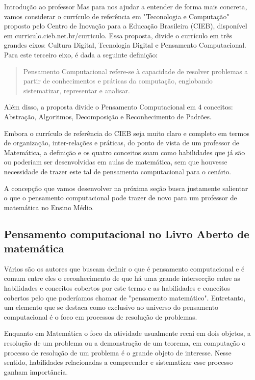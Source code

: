 \begin{apresentacao}{Introdução ao professor}
Mas para nos ajudar a entender de forma mais concreta, vamos considerar o currículo de referência em "Teconologia e Computação"{} proposto pelo Centro de Inovação para a Educação Brasileira (CIEB), disponível em curriculo.cieb.net.br/curriculo. Essa proposta, divide o currículo em três grandes eixos: Cultura Digital, Tecnologia Digital e Pensamento Computacional. Para este terceiro eixo, é dada a seguinte definição:
\begin{quote}
Pensamento Computacional refere-se à capacidade de resolver problemas a partir de conhecimentos e práticas da computação, englobando sistematizar, representar e analisar.
\end{quote}

Além disso, a proposta divide o Pensamento Computacional em 4 conceitos: Abstração, Algoritmos, Decomposição e Reconhecimento de Padrões.

Embora o currículo de referência do CIEB seja muito claro e completo em termos de organização, inter-relações e práticas, do ponto de vista de um professor de Matemática, a definição e os quatro conceitos soam como habilidades que já são ou poderiam ser desenvolvidas em aulas de matemática, sem que houvesse necessidade de trazer este tal de pensamento computacional para o cenário.

A concepção que vamos desenvolver na próxima seção busca justamente salientar o que o pensamento computacional pode trazer de novo para um professor de matemática no Ensino Médio.

\subsection{Pensamento computacional no Livro Aberto de matemática}

Vários são os autores que buscam definir o que é pensamento computacional \citep{shute2017} e é comum entre eles o reconhecimento de que há uma grande intersecção entre as habilidades e conceitos cobertos por este termo e as habilidades e conceitos cobertos pelo que poderíamos chamar de "pensamento matemático". Entretanto, um elemento que se destaca como exclusivo ao universo do pensamento computacional é o foco em processos de resolução de problemas.

Enquanto em Matemática o foco da atividade usualmente recai em dois objetos, a resolução de um problema ou a demonstração de um teorema, em computação o processo de resolução de um problema é o grande objeto de interesse. Nesse sentido, habilidades relacionadas a compreender e sistematizar esse processo ganham importância.


\end{apresentacao}
